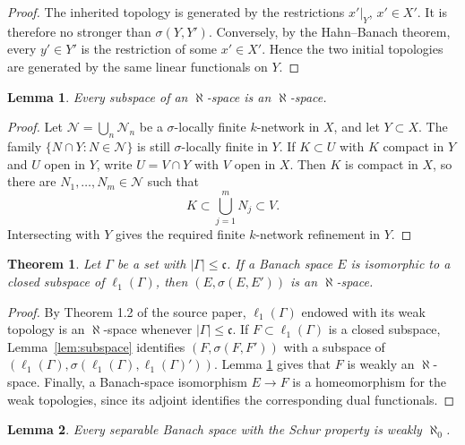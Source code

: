 \documentclass[11pt]{article}
\newtheorem{theorem}{Theorem}
\newtheorem{lemma}{Lemma}
\begin{document}
\begin{proof}
The inherited topology is generated by the restrictions \(x'|_Y\), \(x'\in X'\).
It is therefore no stronger than \(\sigma(Y,Y')\).  Conversely, by the
Hahn--Banach theorem, every \(y'\in Y'\) is the restriction of some
\(x'\in X'\).  Hence the two initial topologies are generated by the same
linear functionals on \(Y\).
\end{proof}

\begin{lemma}\label{lem:hereditary}
Every subspace of an \(\aleph\)-space is an \(\aleph\)-space.
\end{lemma}

\begin{proof}
Let \(\mathcal N=\bigcup_n\mathcal N_n\) be a \(\sigma\)-locally finite
\(k\)-network in \(X\), and let \(Y\subset X\).  The family
\(\{N\cap Y:N\in\mathcal N\}\) is still \(\sigma\)-locally finite in \(Y\).
If \(K\subset U\) with \(K\) compact in \(Y\) and \(U\) open in \(Y\), write
\(U=V\cap Y\) with \(V\) open in \(X\).  Then \(K\) is compact in \(X\), so
there are \(N_1,\dots,N_m\in\mathcal N\) such that
\[
  K\subset \bigcup_{j=1}^m N_j\subset V.
\]
Intersecting with \(Y\) gives the required finite \(k\)-network refinement in
\(Y\).
\end{proof}

\begin{theorem}\label{thm:l1subspaces}
Let \(\Gamma\) be a set with \(|\Gamma|\leq\mathfrak c\).  If a Banach space
\(E\) is isomorphic to a closed subspace of \(\ell_1(\Gamma)\), then
\((E,\sigma(E,E'))\) is an \(\aleph\)-space.
\end{theorem}

\begin{proof}
By Theorem 1.2 of the source paper, \(\ell_1(\Gamma)\) endowed with its weak
topology is an \(\aleph\)-space whenever \(|\Gamma|\leq\mathfrak c\).  If
\(F\subset\ell_1(\Gamma)\) is a closed subspace, Lemma~\ref{lem:subspace}
identifies \((F,\sigma(F,F'))\) with a subspace of
\((\ell_1(\Gamma),\sigma(\ell_1(\Gamma),\ell_1(\Gamma)'))\).  Lemma
\ref{lem:hereditary} gives that \(F\) is weakly an \(\aleph\)-space.  Finally,
a Banach-space isomorphism \(E\to F\) is a homeomorphism for the weak
topologies, since its adjoint identifies the corresponding dual functionals.
\end{proof}

\begin{lemma}\label{lem:separable-schur}
Every separable Banach space with the Schur property is weakly
\(\aleph_0\).
\end{lemma}
\end{document}
